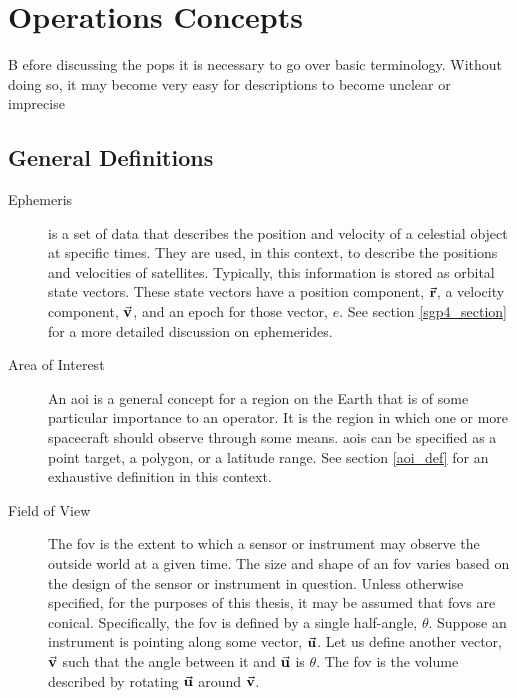 \glsresetall{} 
\chapter{Operations Concepts}

\lettrine[lines=2, findent=0pt, nindent=5pt]{B}{} efore discussing the
\gls{pops} it is necessary to go over basic terminology.  Without doing so, it
may become very easy for descriptions to become unclear or imprecise

\section{General Definitions}

\begin{description} 

    \item[Ephemeris] is a set of data that describes the position and velocity
	of a celestial object at specific times. They are used, in this
	context, to describe the positions and velocities of satellites.
	Typically, this information is stored as orbital state vectors. These
	state vectors have a position component, $\vec{\bm{\mathrm{r}}}$, a velocity
	component, $\vec{\bm{\mathrm{v}}}$, and an epoch for those vector, $e$. See section
	\ref{sgp4_section} for a more detailed discussion on ephemerides.

    \item[Area of Interest] An \gls{aoi} is a general concept for a region on
	the Earth that is of some particular importance to an operator. It is
	the region in which one or more spacecraft should observe through some
	means.  \glspl{aoi} can be specified as a point target, a polygon, or a
	latitude range. See section \ref{aoi_def} for an exhaustive definition
	in this context. 

    \item[Field of View] The \gls{fov} is the extent to which a sensor or
	instrument may observe the outside world at a given time. The size and
	shape of an \gls{fov} varies based on the design of the sensor or
	instrument in question. Unless otherwise specified, for the purposes of
	this thesis, it may be assumed that \glspl{fov} are conical.
	Specifically, the \gls{fov} is defined by a single half-angle,
	$\theta$. Suppose an instrument is pointing along some vector,
	$\vec{\bm{\mathrm{u}}}$. Let us define another vector, $\vec{\bm{\mathrm{v}}}$ such that the angle
	between it and $\vec{\bm{\mathrm{u}}}$ is $\theta$. The \gls{fov} is the volume
	described by rotating $\vec{\bm{\mathrm{u}}}$ around $\vec{\bm{\mathrm{v}}}$.



\end{description}

